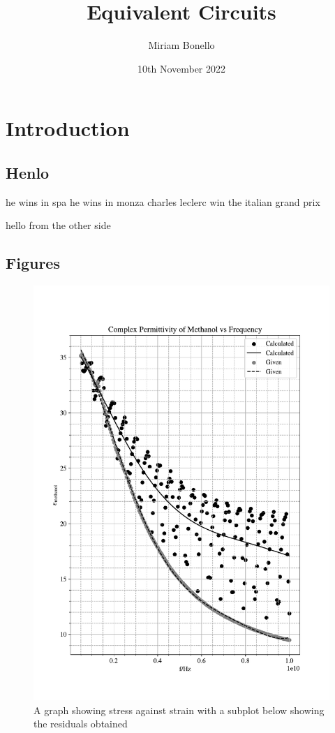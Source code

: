 \documentclass[12pt, a4paper]{article}
\begin{document}
\justifying 
\title{Equivalent Circuits}
\author{Miriam Bonello}
\date{10th November 2022}

\maketitle 

\begin{abstract}
\end{abstract}

\section*{Introduction}\label{section-introduction}
\subsection*{Henlo} 

he wins in spa he wins in monza charles leclerc win the italian grand prix 
\medskip 

hello from the other side 

\subsection*{Figures}\begin{figure}[h!]
    \begin{center}
    \includegraphics[scale=0.75]{Plot1.pdf}
    \caption{A graph showing stress against strain with a subplot below showing the residuals obtained}
    \end{center}
    \end{figure}
\end{document}
